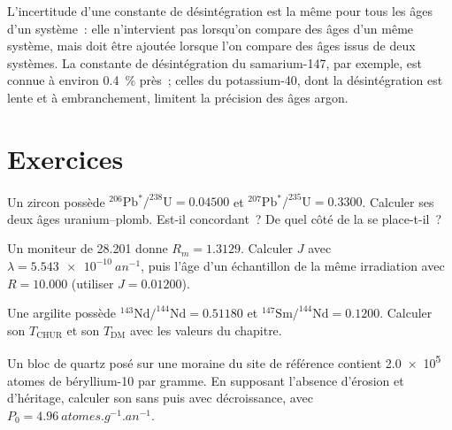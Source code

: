 L'incertitude d'une constante de désintégration est la même pour tous les âges d'un système~:
elle n'intervient pas lorsqu'on compare des âges d'un même système, mais doit être
ajoutée lorsque l'on compare des âges issus de deux systèmes. La constante de
désintégration du samarium-147, par exemple, est connue à environ \qty{0.4}{\percent} près~;
celles du potassium-40, dont la désintégration est lente et à embranchement, limitent la précision des âges argon.


\section{Exercices}

\begin{exercise}[$\star$]\label{exo:b3:advanced-geochronology:1}
Un zircon possède $^{206}\mathrm{Pb}^*/^{238}\mathrm{U} = 0.04500$ et
$^{207}\mathrm{Pb}^*/^{235}\mathrm{U} = 0.3300$. Calculer ses deux âges
uranium--plomb. Est-il concordant~? De quel côté de la 
se place-t-il~? 
\end{exercise}

\begin{exercise}[$\star$]\label{exo:b3:advanced-geochronology:2}
Un moniteur de \qty{28.201}{\Ma} donne $R_m = 1.3129$. Calculer $J$ avec $\lambda
= \qty{5.543e-10}{an^{-1}}$, puis l'âge d'un échantillon de la même irradiation
avec $R = 10.000$ (utiliser $J = 0.01200$).
\end{exercise}

\begin{exercise}[$\star$]\label{exo:b3:advanced-geochronology:3}
Une argilite possède $^{143}\mathrm{Nd}/^{144}\mathrm{Nd} = 0.51180$ et
$^{147}\mathrm{Sm}/^{144}\mathrm{Nd} = 0.1200$. Calculer son $T_{\mathrm{CHUR}}$
et son $T_{\mathrm{DM}}$ avec les valeurs du chapitre.
\end{exercise}

\begin{exercise}[$\star$]\label{exo:b3:advanced-geochronology:4}
Un bloc de quartz posé sur une moraine du site de référence contient \num{2.0e5}
atomes de béryllium-10 par gramme. En supposant l'absence d'érosion et d'héritage,
calculer son  sans puis avec décroissance, avec $P_0 =
\qty{4.96}{atomes.g^{-1}.an^{-1}}$.
\end{exercise}

